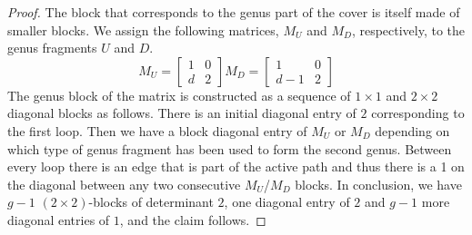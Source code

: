 \documentclass[10pt,a4paper]{amsart}
\begin{document}
\begin{proof}
    
The block that corresponds to the genus part of the cover is itself made of smaller blocks.    We assign  the following matrices, $M_U$ and $M_D$, respectively, to the genus fragments $U$ and $D$. %
\[ M_U=\left[ \begin{array}{cc}
1 & 0 \\
d & 2
\end{array} \right]
%
M_D=\left[ \begin{array}{cc}
1 & 0 \\
d-1 & 2
\end{array} \right]
\]
The genus block of the matrix
is constructed as a sequence of $1\times 1$ and $2\times 2$ diagonal blocks as follows. 
There is an initial diagonal entry of $2$ corresponding to the first loop.
Then we have a block diagonal %
entry of $M_U$ or $M_D$ depending on which type of genus fragment has been used to form the second genus. Between every loop there is an edge that is part of the active path and thus there is a 1 on the diagonal between any two consecutive $M_U$/$M_D$ blocks.
In conclusion, we have $g-1$ $(2\times 2)$-blocks of determinant $2$, one diagonal entry of $2$ and $g-1$ more diagonal entries of $1$, and the claim follows.
\end{proof}
\end{document}
